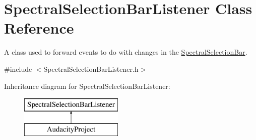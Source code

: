 \hypertarget{class_spectral_selection_bar_listener}{}\section{Spectral\+Selection\+Bar\+Listener Class Reference}
\label{class_spectral_selection_bar_listener}


A class used to forward events to do with changes in the \hyperlink{class_spectral_selection_bar}{Spectral\+Selection\+Bar}.  




{\ttfamily \#include $<$Spectral\+Selection\+Bar\+Listener.\+h$>$}

Inheritance diagram for Spectral\+Selection\+Bar\+Listener\+:\begin{figure}[H]
\begin{center}
\leavevmode
\includegraphics[height=2.000000cm]{class_spectral_selection_bar_listener}
\end{center}
\end{figure}
